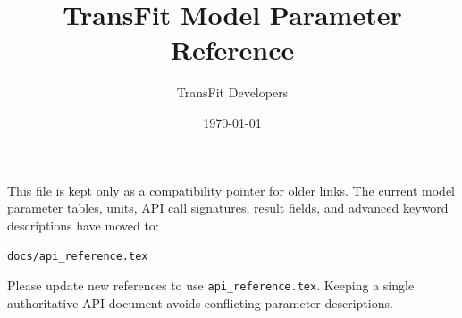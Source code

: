 \documentclass[11pt]{article}
\title{TransFit Model Parameter Reference}
\author{TransFit Developers}
\date{\today}
\begin{document}
\maketitle

This file is kept only as a compatibility pointer for older links.  The
current model parameter tables, units, API call signatures, result fields, and
advanced keyword descriptions have moved to:

\begin{center}
\Large \texttt{docs/api\_reference.tex}
\end{center}

Please update new references to use \texttt{api\_reference.tex}.  Keeping a
single authoritative API document avoids conflicting parameter descriptions.
\end{document}
